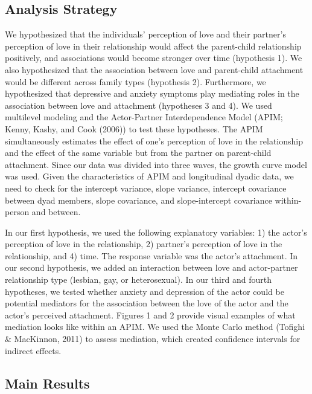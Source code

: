 \documentclass[man]{apa6}
\begin{document}
\hypertarget{analysis-strategy}{%
\subsection{Analysis Strategy}\label{analysis-strategy}}

We hypothesized that the individuals' perception of love and their partner's perception of love in their relationship would affect the parent-child relationship positively, and associations would become stronger over time (hypothesis 1). We also hypothesized that the association between love and parent-child attachment would be different across family types (hypothesis 2). Furthermore, we hypothesized that depressive and anxiety symptoms play mediating roles in the association between love and attachment (hypotheses 3 and 4). We used multilevel modeling and the Actor-Partner Interdependence Model (APIM; Kenny, Kashy, and Cook (2006)) to test these hypotheses. The APIM simultaneously estimates the effect of one's perception of love in the relationship and the effect of the same variable but from the partner on parent-child attachment. Since our data was divided into three waves, the growth curve model was used. Given the characteristics of APIM and longitudinal dyadic data, we need to check for the intercept variance, slope variance, intercept covariance between dyad members, slope covariance, and slope-intercept covariance within-person and between.

In our first hypothesis, we used the following explanatory variables: 1) the actor's perception of love in the relationship, 2) partner's perception of love in the relationship, and 4) time. The response variable was the actor's attachment. In our second hypothesis, we added an interaction between love and actor-partner relationship type (lesbian, gay, or heterosexual). In our third and fourth hypotheses, we tested whether anxiety and depression of the actor could be potential mediators for the association between the love of the actor and the actor's perceived attachment. Figures 1 and 2 provide visual examples of what mediation looks like within an APIM. We used the Monte Carlo method (Tofighi \& MacKinnon, 2011) to assess mediation, which created confidence intervals for indirect effects.

\hypertarget{main-results}{%
\subsection{Main Results}\label{main-results}}
\end{document}

